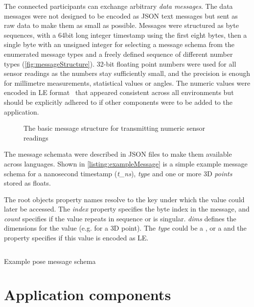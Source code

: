 The connected participants can exchange arbitrary \emph{data messages}.
The data messages were not designed to be encoded as \ac{JSON} text messages but sent as raw data to make them as small as possible.
Messages were structured as byte sequences, with a 64bit long integer timestamp using the first eight bytes, then a single byte with an unsigned integer for selecting a message schema from the enumerated message types and a freely defined sequence of different number types (\autoref{fig:messageStructure}).
32-bit floating point numbers were used for all sensor readings as the numbers stay sufficiently small, and the precision is enough for millimetre measurements, statistical values or angles.
The numeric values were encoded in \ac{LE} format~\parencite{cohenEndianess} that appeared consistent across all environments but should be explicitly adhered to if other components were to be added to the application.

\begin{figure}[!ht]
\centering

\caption[Generic Message Structure]{The basic message structure for transmitting numeric sensor readings\protect}
\label{fig:messageStructure}
\end{figure}

The message schemata were described in \ac{JSON} files to make them available across languages.
Shown in \autoref{listing:exampleMessage} is a simple example message schema for a nanosecond timestamp (\emph{{t\_ns}}), \emph{type} and one or more \ac{3D} \emph{points} stored as floats.

The root object\textquotesingle s property names resolve to the key under which the value could later be accessed.
The \emph{index} property specifies the byte index in the message, and \emph{count} specifies if the value repeats in sequence or is singular. \emph{dims} defines the dimensions for the value (e.g.  for a \ac{3D} point).
The \emph{type} could be a ,  or a  and the property  specifies if this value is encoded as \ac{LE}.

\begin{listing}[!ht]
\inputminted{json}{04_Artefakte/03_Listings/example-pose-message.json}
\caption{Example pose message schema}
\label{listing:exampleMessage}
\end{listing}

\section{Application components}
\label{sec:application-components}

